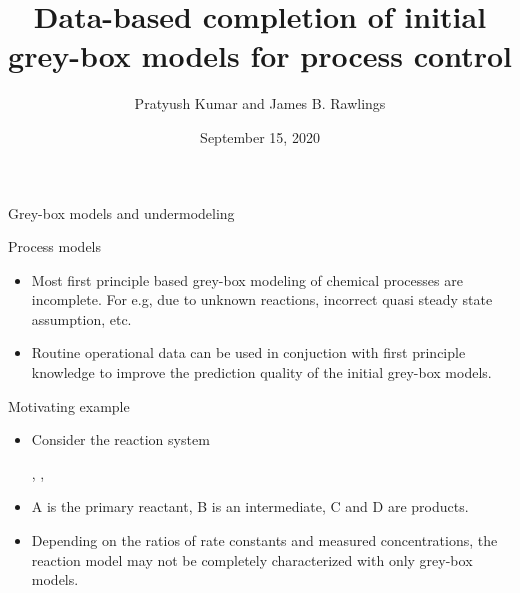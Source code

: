 \documentclass[xcolor=dvipsnames, 8pt]{beamer} %
\title[Data-based completion of initial grey-box models for process control]{Data-based completion of initial grey-box models for process control}
\date{September 15, 2020}
\author[Kumar and Rawlings]{\large Pratyush Kumar and James B. Rawlings}
\institute[UCSB]{
	\begin{minipage}{4in}
		\vspace{-10pt}
		\centering
		\raisebox{-0.1\height}{\texttt{[image: UCSB\_seal]}}
	\end{minipage}
	\vspace{10pt}
	\newline
	{\large Department of Chemical Engineering}
	\vspace{10pt}
	\newline
	{\large TWCCC Meeting (Virtual)}}
\begin{document}
\frame{\titlepage}

\begin{frame}{Grey-box models and undermodeling}
\begin{block}{Process models}
\begin{itemize}
	\item Most first principle based grey-box modeling of chemical processes
	are incomplete. For e.g, due to unknown reactions, incorrect 
	quasi steady state assumption, etc.
	\item Routine operational data can be used in conjuction 
	with first principle knowledge to improve the prediction 
	quality of the initial grey-box models.
\end{itemize}
\end{block}

\begin{block}{Motivating example}
	\begin{itemize}
		\item Consider the reaction system
		\begin{center}
			,\hspace{0.2in} , \hspace{0.2in} 
		\end{center}
		\item A is the primary reactant, B is an intermediate, 
		C and D are products.
		\item Depending on the ratios of rate constants and measured 
		concentrations, the reaction model may not be 
		completely characterized with only grey-box models.
	\end{itemize}
\end{block}
\end{frame}
\end{document}
